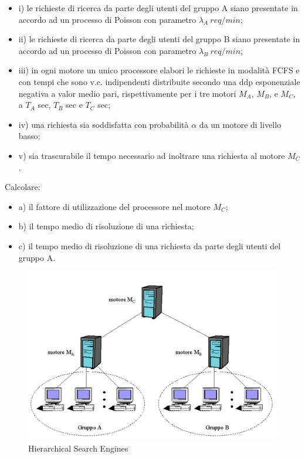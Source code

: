\begin{itemize}

\item{i)} le richieste di ricerca da parte degli utenti del gruppo A siano presentate in accordo ad un processo di Poisson con parametro $\lambda_A\ req/min$;
\item{ii)} le richieste di ricerca da parte degli utenti del gruppo B siano presentate in accordo ad un processo di Poisson con parametro $\lambda_B\ req/min$;
\item{iii)} in ogni motore un unico processore elabori le richieste in modalità FCFS e con tempi che sono v.c. indipendenti distribuite secondo una ddp esponenziale negativa a valor medio pari, rispettivamente per i tre motori $M_A$, $M_B$, e $M_C$, a $T_A$ sec, $T_B$ sec e $T_C$ sec;
\item{iv)} una richiesta sia soddisfatta con probabilità $\alpha$ da un motore di livello basso;
\item{v)} sia trascurabile il tempo necessario ad inoltrare una richiesta al motore $M_C$.  

\end{itemize}

Calcolare:

\begin{itemize}

\item{a)} il fattore di utilizzazione del processore nel motore $M_C$;
\item{b)} il tempo medio di risoluzione di una richiesta;
\item{c)} il tempo medio di risoluzione di una richiesta da parte degli utenti del gruppo A. 
  
\end{itemize}

\begin{center}
\begin{figure}[H]
\centering
\includegraphics[scale=1]{figures/ex/se.png}
\caption{Hierarchical Search Engines}
\end{figure}
\end{center}

